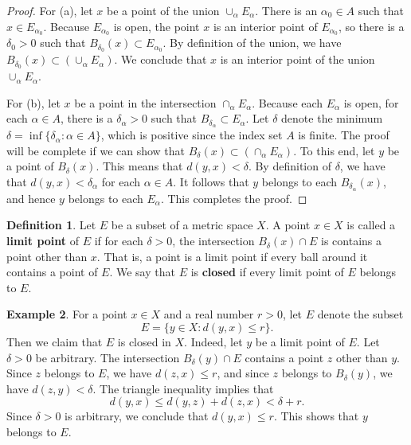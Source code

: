\documentclass[12pt]{article}
\theoremstyle{definition}
\newtheorem{definition}{Definition}
\newtheorem{example}[definition]{Example}
\theoremstyle{theorem}
\begin{document}
\begin{proof}
For (a), let $x$ be a point of the union $\cup_\alpha E_\alpha$. There is an $\alpha_0 \in A$ such that $x \in E_{\alpha_0}$. Because $E_{\alpha_0}$ is open, the point $x$ is an interior point of $E_{\alpha_0}$, so there is a $\delta_0 > 0$ such that $B_{\delta_0}(x) \subset E_{\alpha_0}$. By definition of the union, we have $B_{\delta_0}(x) \subset \left(\cup_\alpha E_\alpha\right)$. We conclude that $x$ is an interior point of the union $\cup_\alpha E_\alpha$. 

For (b), let $x$ be a point in the intersection $\cap_\alpha E_\alpha$. Because each $E_\alpha$ is open, for each $\alpha \in A$, there is a $\delta_\alpha > 0$ such that $B_{\delta_\alpha} \subset E_\alpha$. Let $\delta$ denote the minimum $\delta = \inf\{\delta_\alpha : \alpha \in A\}$, which is positive since the index set $A$ is finite. The proof will be complete if we can show that $B_\delta(x) \subset \left(\cap_\alpha E_\alpha \right)$. To this end, let $y$ be a point of $B_\delta(x)$. This means that $d(y,x) < \delta$. By definition of $\delta$, we have that $d(y,x) < \delta_\alpha$ for each $\alpha \in A$. It follows that $y$ belongs to each $B_{\delta_\alpha}(x)$, and hence $y$ belongs to each $E_\alpha$. This completes the proof. 
\end{proof}

\begin{definition}
Let $E$ be a subset of a metric space $X$. A point $x \in X$ is called a \textbf{limit point} of $E$ if for each $\delta > 0$, the intersection $B_\delta(x) \cap E$ is contains a point other than $x$. That is, a point is a limit point if every ball around it contains a point of $E$. We say that $E$ is \textbf{closed} if every limit point of $E$ belongs to $E$. 
\end{definition}

\begin{example}
For a point $x \in X$ and a real number $r > 0$, let $E$ denote the subset
\[
E = \{y \in X: d(y,x) \leqslant r\}.
\]
Then we claim that $E$ is closed in $X$. Indeed, let $y$ be a limit point of $E$. Let $\delta > 0$ be arbitrary. The intersection $B_\delta(y) \cap E$ contains a point $z$ other than $y$. Since $z$ belongs to $E$, we have $d(z,x) \leqslant r$, and since $z$ belongs to $B_\delta(y)$, we have $d(z,y) < \delta$. The triangle inequality implies that  
\[
d(y,x) \leqslant d(y,z) + d(z,x) < \delta + r.
\]
Since $\delta > 0$ is arbitrary, we conclude that $d(y,x) \leqslant r$. This shows that $y$ belongs to $E$. 
\end{example}
\end{document}
